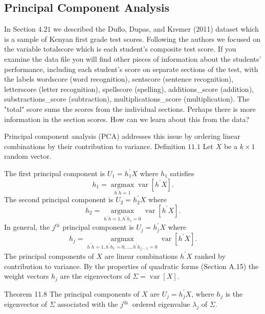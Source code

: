 \documentclass[10pt]{article}
\begin{document}
\subsection{Principal Component Analysis}
In Section $4.21$ we described the Duflo, Dupas, and Kremer (2011) dataset which is a sample of Kenyan first grade test scores. Following the authors we focused on the variable totalscore which is each student's composite test score. If you examine the data file you will find other pieces of information about the students' performance, including each student's score on separate sections of the test, with the labels wordscore (word recognition), sentscore (sentence recognition), letterscore (letter recognition), spellscore (spelling), additions\_score (addition), substractions\_score (subtraction), multiplications\_score (multiplication). The "total" score sums the scores from the individual sections. Perhaps there is more information in the section scores. How can we learn about this from the data?

Principal component analysis (PCA) addresses this issue by ordering linear combinations by their contribution to variance. Definition $11.1$ Let $X$ be a $k \times 1$ random vector.

The first principal component is $U_{1}=h_{1}^{\prime} X$ where $h_{1}$ satisfies
$$
h_{1}=\underset{h^{\prime} h=1}{\operatorname{argmax}} \operatorname{var}\left[h^{\prime} X\right] .
$$
The second principal component is $U_{2}=h_{2}^{\prime} X$ where
$$
h_{2}=\underset{h^{\prime} h=1, h^{\prime} h_{1}=0}{\operatorname{argmax}} \operatorname{var}\left[h^{\prime} X\right] .
$$
In general, the $j^{t h}$ principal component is $U_{j}=h_{j}^{\prime} X$ where
$$
h_{j}=\underset{h^{\prime} h=1, h^{\prime} h_{1}=0, \ldots, h^{\prime} h_{j-1}=0}{\operatorname{argmax}} \operatorname{var}\left[h^{\prime} X\right] .
$$
The principal components of $X$ are linear combinations $h^{\prime} X$ ranked by contribution to variance. By the properties of quadratic forms (Section A.15) the weight vectors $h_{j}$ are the eigenvectors of $\Sigma=\operatorname{var}[X]$.

Theorem 11.8 The principal components of $X$ are $U_{j}=h_{j}^{\prime} X$, where $h_{j}$ is the eigenvector of $\Sigma$ associated with the $j^{\text {th }}$ ordered eigenvalue $\lambda_{j}$ of $\Sigma$.
\end{document}
